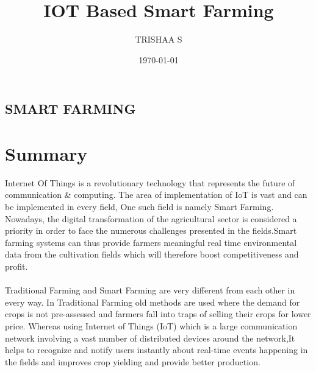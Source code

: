 \documentclass{report}
\title{IOT Based Smart Farming}
\author{TRISHAA S}
\date{\today}
\begin{document}

    
\begin{center}
        \section*{SMART FARMING}
\end{center}
\setlength{\columnsep}{1.0cm}
    \large
    \section*{Summary}

Internet Of Things is a revolutionary technology that 
represents the future of communication & computing. The area 
of implementation of IoT is vast and can be implemented in 
every field, One such field is namely Smart Farming. Nowadays, 
the digital transformation of the agricultural sector is 
considered a priority in order to face the numerous challenges 
presented in the fields.Smart farming systems can thus provide
farmers meaningful real time environmental data from the 
cultivation fields which will therefore boost competitiveness 
and profit.\\
\\
Traditional Farming and Smart Farming are very different from 
each other in every way. In Traditional Farming old methods 
are used where the demand for crops is not pre-assessed and 
farmers fall into traps of selling their crops for lower 
price. Whereas using Internet of Things (IoT) which is a large
communication network involving a vast number of distributed
devices around the network,It helps to recognize and notify 
users instantly about real-time events happening in the fields
and improves crop yielding and provide better production.
\end{document}
